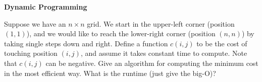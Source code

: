 \item {} {\bf Dynamic Programming}

Suppose we have an $n\times n$ grid. We start in the upper-left corner (position
$(1,1)$), and we would like to reach the lower-right corner (position $(n,n)$)
by taking single steps down and right. Define a function $c(i, j)$ to be the
cost of touching position $(i, j)$, and assume it takes constant time to
compute. Note that $c(i, j)$ can be negative. Give an algorithm for computing
the minimum cost in the most efficient way. What is the runtime (just give the
big-O)?
